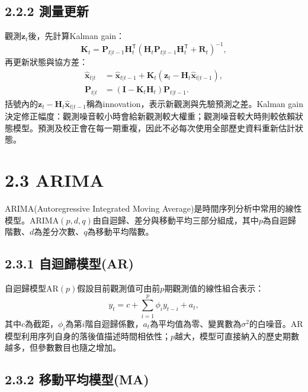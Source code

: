 \subsection*{2.2.2 測量更新}

觀測$\boldsymbol z_t$後，先計算Kalman gain：
\begin{equation}
 \boldsymbol K_t=\boldsymbol P_{t|t-1}\boldsymbol H_t^{\mathsf T}
 \left(\boldsymbol H_t\boldsymbol P_{t|t-1}\boldsymbol H_t^{\mathsf T}
 +\boldsymbol R_t\right)^{-1},
\end{equation}
再更新狀態與協方差：
\begin{align}
 \widehat{\boldsymbol{x}}_{t|t}
 &=\widehat{\boldsymbol{x}}_{t|t-1}
 +\boldsymbol K_t
 \left(\boldsymbol z_t-\boldsymbol H_t\widehat{\boldsymbol{x}}_{t|t-1}\right),\\
 \boldsymbol P_{t|t}
 &=\left(\boldsymbol I-\boldsymbol K_t\boldsymbol H_t\right)
 \boldsymbol P_{t|t-1}.
\end{align}
括號內的$\boldsymbol z_t-\boldsymbol H_t\widehat{\boldsymbol x}_{t|t-1}$稱為innovation，表示新觀測與先驗預測之差。Kalman gain決定修正幅度：觀測噪音較小時會給新觀測較大權重；觀測噪音較大時則較依賴狀態模型。預測及校正會在每一期重複，因此不必每次使用全部歷史資料重新估計狀態。

\section*{2.3 ARIMA}

ARIMA(Autoregressive Integrated Moving Average)是時間序列分析中常用的線性模型\cite{boxjenkins2015}。ARIMA$(p,d,q)$由自迴歸、差分與移動平均三部分組成，其中$p$為自迴歸階數、$d$為差分次數、$q$為移動平均階數。

\subsection*{2.3.1 自迴歸模型(AR)}

自迴歸模型AR$(p)$假設目前觀測值可由前$p$期觀測值的線性組合表示：
\begin{equation}
 y_t=c+\sum_{i=1}^{p}\phi_i y_{t-i}+a_t,
 \label{eq:ar}
\end{equation}
其中$c$為截距，$\phi_i$為第$i$階自迴歸係數，$a_t$為平均值為零、變異數為$\sigma^2$的白噪音。AR模型利用序列自身的落後值描述時間相依性；$p$越大，模型可直接納入的歷史期數越多，但參數數目也隨之增加。

\subsection*{2.3.2 移動平均模型(MA)}

